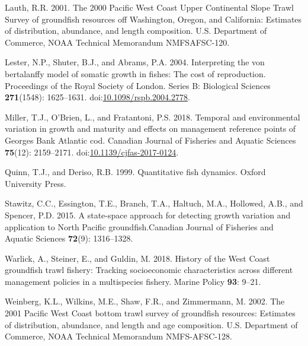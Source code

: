 \documentclass[
]{article}
\newlength{\cslhangindent}
\newlength{\cslentryspacingunit} %
\newenvironment{CSLReferences}[2] %
 {%
  \setlength{\parindent}{0pt}
  \ifodd #1
  \let\oldpar\par
  \def\par{\hangindent=\cslhangindent\oldpar}
  \fi
  \setlength{\parskip}{#2\cslentryspacingunit}
 }%
 {}
\newcommand{\cjfas}{Canadian Journal of Fisheries and Aquatic Sciences\xspace}
\begin{document}
\begin{CSLReferences}{1}{0}
\leavevmode{}%
Lauth, R.R. 2001. {The 2000 Pacific West Coast Upper Continental Slope
Trawl Survey of groundfish resources off Washington, Oregon, and
California: Estimates of distribution, abundance, and length
composition}. {U.S. Department of Commerce, NOAA Technical Memorandum
NMFSAFSC-120}.

\leavevmode{}%
Lester, N.P., Shuter, B.J., and Abrams, P.A. 2004. Interpreting the von
bertalanffy model of somatic growth in fishes: The cost of reproduction.
Proceedings of the Royal Society of London. Series B: Biological
Sciences \textbf{271}(1548): 1625--1631.
doi:\href{https://doi.org/10.1098/rspb.2004.2778}{10.1098/rspb.2004.2778}.

\leavevmode{}%
Miller, T.J., O'Brien, L., and Fratantoni, P.S. 2018. Temporal and
environmental variation in growth and maturity and effects on management
reference points of {G}eorges {B}ank {A}tlantic cod. Canadian Journal of
Fisheries and Aquatic Sciences \textbf{75}(12): 2159--2171.
doi:\href{https://doi.org/10.1139/cjfas-2017-0124}{10.1139/cjfas-2017-0124}.

\leavevmode{}%
Quinn, T.J., and Deriso, R.B. 1999. Quantitative fish dynamics. Oxford
University Press.

\leavevmode{}%
Stawitz, C.C., Essington, T.E., Branch, T.A., Haltuch, M.A., Hollowed,
A.B., and Spencer, P.D. 2015. A state-space approach for detecting
growth variation and application to {N}orth {P}acific groundfish.\cjfas
\textbf{72}(9): 1316--1328.

\leavevmode{}%
Warlick, A., Steiner, E., and Guldin, M. 2018. {History of the West
Coast groundfish trawl fishery: Tracking socioeconomic characteristics
across different management policies in a multispecies fishery}. Marine
Policy \textbf{93}: 9--21.

\leavevmode{}%
Weinberg, K.L., Wilkins, M.E., Shaw, F.R., and Zimmermann, M. 2002. The
2001 {P}acific {W}est {C}oast bottom trawl survey of groundfish
resources: Estimates of distribution, abundance, and length and age
composition. {U}.{S}. {D}epartment of {C}ommerce, {NOAA} {T}echnical
{M}emorandum {NMFS-AFSC}-128.

\end{CSLReferences}
\end{document}
